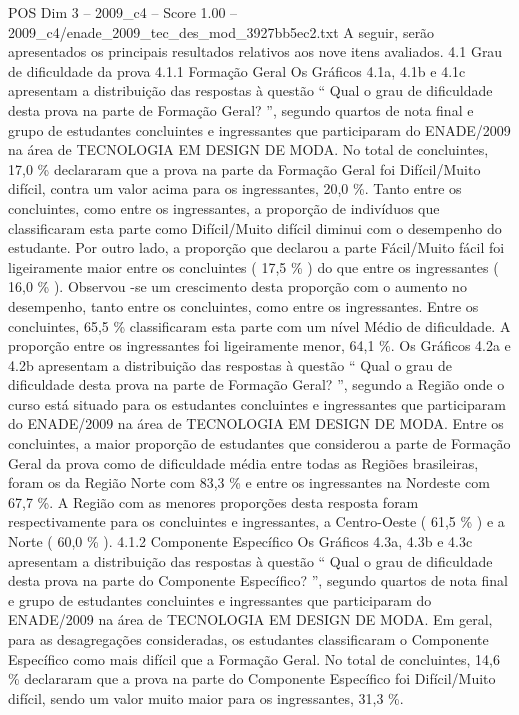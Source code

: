\begin{textsample}{POS Dim 3 – 2009\_c4 – Score 1.00 – 2009\_c4/enade\_2009\_tec\_des\_mod\_3927bb5ec2.txt}
A seguir, serão apresentados os principais resultados relativos aos nove itens avaliados. 4.1 Grau de dificuldade da prova 4.1.1 Formação Geral Os Gráficos 4.1a, 4.1b e 4.1c apresentam a distribuição das respostas à questão “ Qual o grau de dificuldade desta prova na parte de Formação Geral? ”, segundo quartos de nota final e grupo de estudantes concluintes e ingressantes que participaram do ENADE/2009 na área de TECNOLOGIA EM DESIGN DE MODA.
No total de concluintes, 17,0 \% declararam que a prova na parte da Formação Geral foi Difícil/Muito difícil, contra um valor acima para os ingressantes, 20,0 \%.
Tanto entre os concluintes, como entre os ingressantes, a proporção de indivíduos que classificaram esta parte como Difícil/Muito difícil diminui com o desempenho do estudante.
Por outro lado, a proporção que declarou a parte Fácil/Muito fácil foi ligeiramente maior entre os concluintes ( 17,5 \% ) do que entre os ingressantes ( 16,0 \% ).
Observou -se um crescimento desta proporção com o aumento no desempenho, tanto entre os concluintes, como entre os ingressantes.
Entre os concluintes, 65,5 \% classificaram esta parte com um nível Médio de dificuldade.
A proporção entre os ingressantes foi ligeiramente menor, 64,1 \%.
Os Gráficos 4.2a e 4.2b apresentam a distribuição das respostas à questão “ Qual o grau de dificuldade desta prova na parte de Formação Geral? ”, segundo a Região onde o curso está situado para os estudantes concluintes e ingressantes que participaram do ENADE/2009 na área de TECNOLOGIA EM DESIGN DE MODA.
Entre os concluintes, a maior proporção de estudantes que considerou a parte de Formação Geral da prova como de dificuldade média entre todas as Regiões brasileiras, foram os da Região Norte com 83,3 \% e entre os ingressantes na Nordeste com 67,7 \%.
A Região com as menores proporções desta resposta foram respectivamente para os concluintes e ingressantes, a Centro-Oeste ( 61,5 \% ) e a Norte ( 60,0 \% ). 4.1.2 Componente Específico Os Gráficos 4.3a, 4.3b e 4.3c apresentam a distribuição das respostas à questão “ Qual o grau de dificuldade desta prova na parte do Componente Específico? ”, segundo quartos de nota final e grupo de estudantes concluintes e ingressantes que participaram do ENADE/2009 na área de TECNOLOGIA EM DESIGN DE MODA.
Em geral, para as desagregações consideradas, os estudantes classificaram o Componente Específico como mais difícil que a Formação Geral.
No total de concluintes, 14,6 \% declararam que a prova na parte do Componente Específico foi Difícil/Muito difícil, sendo um valor muito maior para os ingressantes, 31,3 \%.

\end{textsample}
